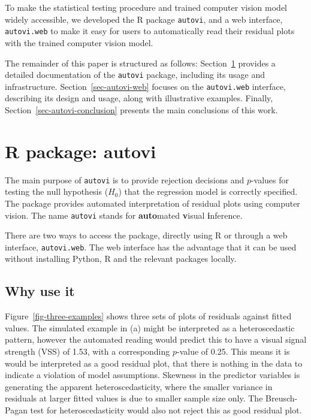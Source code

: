 \documentclass[
doublespace,
  times]{anzsauth}
\begin{document}
To make the statistical testing procedure and trained computer vision
model widely accessible, we developed the R package \texttt{autovi}, and
a web interface, \texttt{autovi.web} to make it easy for users to
automatically read their residual plots with the trained computer vision
model.

The remainder of this paper is structured as follows:
Section~\ref{sec-autovi} provides a detailed documentation of the
\texttt{autovi} package, including its usage and infrastructure.
Section~\ref{sec-autovi-web} focuses on the \texttt{autovi.web}
interface, describing its design and usage, along with illustrative
examples. Finally, Section~\ref{sec-autovi-conclusion} presents the main
conclusions of this work.

\section{R package: autovi}\label{sec-autovi}

The main purpose of \texttt{autovi} is to provide rejection decisions
and \(p\)-values for testing the null hypothesis (\(H_0\)) that the
regression model is correctly specified. The package provides automated
interpretation of residual plots using computer vision. The name
\texttt{autovi} stands for \textbf{auto}mated \textbf{v}isual
\textbf{i}nference.

There are two ways to access the package, directly using R or through a
web interface, \texttt{autovi.web}. The web interface has the advantage
that it can be used without installing Python, R and the relevant
packages locally.

\subsection{Why use it}\label{sec-why}

Figure~\ref{fig-three-examples} shows three sets of plots of residuals
against fitted values. The simulated example in (a) might be interpreted
as a heteroscedastic pattern, however the automated reading would
predict this to have a visual signal strength (VSS) of 1.53, with a
corresponding \(p\)-value of 0.25. This means it is would be interpreted
as a good residual plot, that there is nothing in the data to indicate a
violation of model assumptions. Skewness in the predictor variables is
generating the apparent heteroscedasticity, where the smaller variance
in residuals at larger fitted values is due to smaller sample size only.
The Breusch-Pagan test \citep{breusch1979simple} for heteroscedasticity
would also not reject this as good residual plot.
\end{document}
